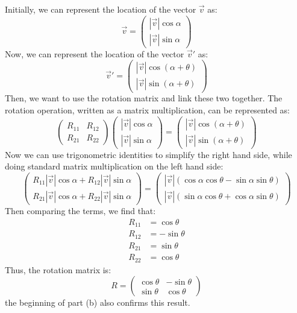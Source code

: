 \documentclass{article}
\begin{document}
\begin{solution}
		Initially, we can represent the location of the vector $\vec v$ as:
		\[
		\vec v = \begin{pmatrix} |\vec v| \cos \alpha\\ |\vec v| \sin \alpha \end{pmatrix} 
		\] 
		Now, we can represent the location of the vector $\vec v'$ as:
		\[
		\vec v' = \begin{pmatrix} |\vec v| \cos (\alpha + \theta)\\
		|\vec v| \sin(\alpha + \theta) \end{pmatrix} 
		\] 
		Then, we want to use the rotation matrix and link these two together. The rotation operation, written as
		a matrix multiplication, can be represented as:
		\[
			\begin{pmatrix} R_{11} & R_{12}\\R_{21} & R_{22} \end{pmatrix} \begin{pmatrix} |\vec v| \cos \alpha\\
			|\vec v| \sin \alpha \end{pmatrix} = \begin{pmatrix} |\vec v| \cos(\alpha + \theta)\\
		|\vec v| \sin(\alpha + \theta) \end{pmatrix} 
		\] 
		Now we can use trigonometric identities to simplify the right hand side, while doing standard matrix 
		multiplication on the left hand side:
		\[
		\begin{pmatrix} R_{11}|\vec v| \cos \alpha + R_{12}|\vec v| \sin \alpha \\
			R_{21}|\vec v| \cos \alpha + R_{22}|\vec v| \sin \alpha \end{pmatrix}  =
			\begin{pmatrix} |\vec v|(\cos \alpha \cos \theta - \sin \alpha \sin \theta)\\ 
			|\vec v|(\sin \alpha \cos \theta + \cos \alpha \sin \theta)  \end{pmatrix} 
		\] 
		Then comparing the terms, we find that:
		\begin{align*}
			R_{11} &= \cos \theta\\
			R_{12} &= -\sin \theta \\
			R_{21} &=  \sin \theta \\
			R_{22} &=  \cos \theta 
		\end{align*}
		Thus, the rotation matrix is:
		\[
			R = \begin{pmatrix} \cos \theta & -\sin \theta \\ \sin \theta & \cos \theta \end{pmatrix} 
		\] 
		the beginning of part (b) also confirms this result. 
\end{solution}
\end{document}
